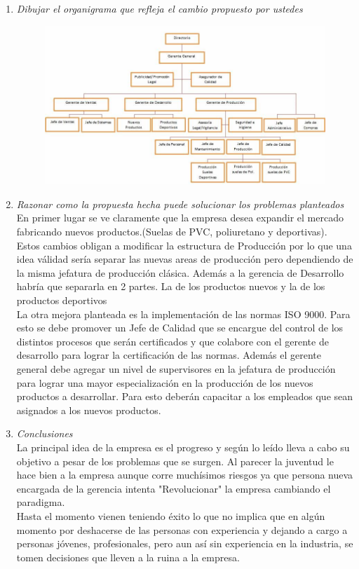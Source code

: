\documentclass[a4paper,10pt]{article}
\begin{document}
\begin{enumerate}
						
			\item \textit{Dibujar el organigrama que refleja el cambio propuesto por ustedes}\\
			\begin{figure}[!h]
			\includegraphics[width=1\textwidth]{imagenes/SolucionPropuestaGringo.jpg}
			\end{figure}		
						
			\item \textit{Razonar como la propuesta hecha puede solucionar los problemas planteados}\\
			En primer lugar se ve claramente que la empresa desea expandir el mercado fabricando nuevos productos.(Suelas de PVC, poliuretano y deportivas). Estos cambios obligan a modificar la estructura de Producci\'on por lo que una idea v\'alidad ser\'ia separar las nuevas areas de producci\'on pero dependiendo de la misma jefatura de producci\'on cl\'asica. Adem\'as a la gerencia de Desarrollo habr\'ia que separarla en 2 partes. La de los productos nuevos y la de los productos deportivos\\
			La otra mejora planteada es la implementaci\'on de las normas ISO 9000. Para esto se debe promover un Jefe de Calidad que se encargue del control de los distintos procesos que serán certificados y que colabore con el gerente de desarrollo para lograr la certificación de las normas. Adem\'as el gerente general debe agregar un nivel de supervisores en la jefatura de producción para lograr una mayor especialización en la  producción de los nuevos productos a desarrollar. Para esto deber\'an capacitar a los empleados que sean asignados a los nuevos productos.
			
			\item \textit{Conclusiones}\\
			La principal idea de la empresa es el progreso y seg\'un lo le\'ido lleva a cabo su objetivo a pesar de los problemas que se surgen. Al parecer la juventud le hace bien a la empresa aunque corre muchísimos riesgos ya que persona nueva encargada de la gerencia intenta "Revolucionar" la empresa cambiando el paradigma.\\
			Hasta el momento vienen teniendo éxito lo que no implica que en alg\'un momento por deshacerse de las personas con experiencia y dejando a cargo a personas jóvenes, profesionales, pero aun así sin experiencia en la industria, se tomen decisiones que lleven a la ruina a la empresa.\\
			

\end{enumerate}
\end{document}
